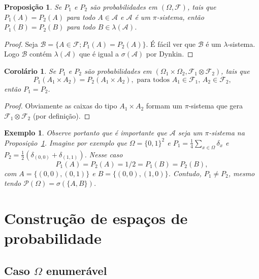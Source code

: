 \documentclass[reqno]{article}
\newcommand*\1{\mathds{1}}
\newtheorem{corollary}[theorem]{Corolário}
\newtheorem{proposition}[theorem]{Proposição}
\newtheorem{example}{Exemplo}[section]
\begin{document}
\begin{proposition}
  \label{p:P12_equal_pi}
  Se $P_1$ e $P_2$ são probabilidades em $(\Omega, \mathcal{F})$, tais que $P_1(A) = P_2(A)$ para todo $A \in \mathcal{A}$ e $\mathcal{A}$ é um $\pi$-sistema, então $P_1(B) = P_2(B)$ para todo $B \in \lambda(\mathcal{A})$.
\end{proposition}

\begin{proof}
  Seja $\mathcal{B} = \{A \in \mathcal{F}; P_1(A) = P_2(A)\}$.
  É fácil ver que $\mathcal{B}$ é um $\lambda$-sistema.
  Logo $\mathcal{B}$ contém $\lambda(\mathcal{A})$ que é igual a $\sigma(\mathcal{A})$ por Dynkin.
\end{proof}

\begin{corollary}
  Se $P_1$ e $P_2$ são probabilidades em $(\Omega_1 \times \Omega_2, \mathcal{F}_1 \otimes \mathcal{F}_2)$, tais que
  \begin{equation}
    P_1(A_1 \times A_2) = P_2(A_1 \times A_2), \text{ para todos $A_1 \in \mathcal{F}_1$, $A_2 \in \mathcal{F}_2$,}
  \end{equation}
  então $P_1 = P_2$.
\end{corollary}

\begin{proof}
  Obviamente as caixas do tipo $A_1 \times A_2$ formam um $\pi$-sistema que gera $\mathcal{F}_1 \otimes \mathcal{F}_2$ (por definição).
\end{proof}

\begin{example}
  Observe portanto que é importante que $\mathcal{A}$ seja um $\pi$-sistema na Proposição~\ref{p:P12_equal_pi}.
  Imagine por exemplo que $\Omega = \{0,1\}^2$ e $P_1 = \tfrac 14 \sum_{x \in \Omega} \delta_x$ e $P_2 = \tfrac 12 (\delta_{(0,0)} + \delta_{(1,1)})$.
  Nesse caso
  \begin{equation}
    P_1(A) = P_2(A) = 1/2 = P_1(B) = P_2(B),
  \end{equation}
  com $A = \{(0,0), (0,1)\}$ e $B = \{(0,0), (1,0)\}$.
  Contudo, $P_1 \neq P_2$, mesmo tendo $\mathcal{P}(\Omega) = \sigma(\{A,B\})$.
\end{example}

\section{Construção de espaços de probabilidade}

\subsection{Caso $\Omega$ enumerável}
\end{document}
